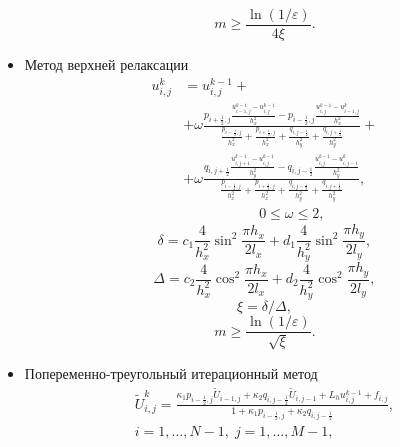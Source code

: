 \begin{itemize}
\begin{equation}
    m \geqslant \frac{\ln(1 / \varepsilon)}{4 \xi}.
  \end{equation}
  \item Метод верхней релаксации
  \begin{equation}
  \begin{aligned}
    u_{i, j}^k & = u_{i, j}^{k-1} + \\
    & + \omega \frac{p_{i+\frac{1}{2}, j} \frac{u_{i-1, j}^{k-1} - u_{i, j}^{k-1}}{h_x^2} - p_{i-\frac{1}{2}, j} \frac{u_{i, j}^{k-1} - u_{i-1, j}^k}{h_x^2}}{\frac{p_{i-\frac{1}{2}, j}}{h_x^2} + \frac{p_{i+\frac{1}{2}, j}}{h_x^2} + \frac{q_{i, j-\frac{1}{2}}}{h_y^2} + \frac{q_{i, j+\frac{1}{2}}}{h_y^2}} + \\
    & + \omega \frac{q_{i, j+\frac{1}{2}} \frac{u_{i, j+1}^{k-1} - u_{i, j}^{k-1}}{h_y^2} - q_{i, j-\frac{1}{2}} \frac{u_{i, j}^{k-1} - u_{i, j-1}^k}{h_y^2}}{\frac{p_{i-\frac{1}{2}, j}}{h_x^2} + \frac{p_{i+\frac{1}{2}, j}}{h_x^2} + \frac{q_{i, j-\frac{1}{2}}}{h_y^2} + \frac{q_{i, j+\frac{1}{2}}}{h_y^2}}, \\
    & \hspace{65pt} 0 \leq \omega \leq 2,
  \end{aligned}
  \end{equation}
  \begin{equation}
    \delta = c_1 \frac{4}{h_x^2} \sin^2{\frac{\pi h_x}{2 l_x}} + d_1 \frac{4}{h_y^2} \sin^2{\frac{\pi h_y}{2 l_y}},
  \end{equation}
  \begin{equation}
    \Delta = c_2 \frac{4}{h_x^2} \cos^2{\frac{\pi h_x}{2 l_x}} + d_2 \frac{4}{h_y^2} \cos^2{\frac{\pi h_y}{2 l_y}},
  \end{equation}
  \begin{equation}
    \xi = \delta / \Delta,
  \end{equation}
  \begin{equation}
    m \geqslant \frac{\ln(1 / \varepsilon)}{\sqrt{\xi}}.
  \end{equation}
  \item Попеременно-треугольный итерационный метод
  \begin{equation}
  \begin{gathered}
    \tilde{U}_{i, j}^k = \frac{\kappa_1 p_{i-\frac{1}{2}, j} \tilde{U}_{i-1, j} + \kappa_2 q_{i, j-\frac{1}{2}} \tilde{U}_{i, j-1} + L_h u_{i, j}^{k-1} + f_{i, j}}{1 + \kappa_1 p_{i-\frac{1}{2}, j} + \kappa_2 q_{i, j-\frac{1}{2}}}, \\
    i = 1, \ldots, N - 1, \; j = 1, \ldots, M - 1, \\

\end{gathered}
\end{equation}
\end{itemize}
